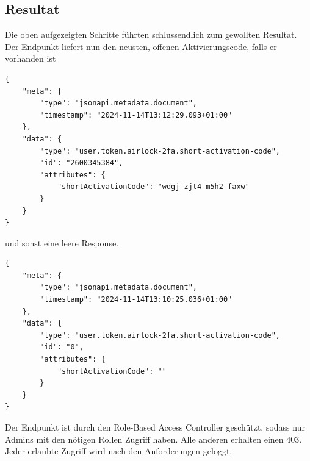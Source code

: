 \subsection{Resultat}
Die oben aufgezeigten Schritte führten schlussendlich zum gewollten Resultat. Der Endpunkt liefert nun den neusten, offenen Aktivierungscode, falls er vorhanden ist
\begin{verbatim}
{
	"meta": {
		"type": "jsonapi.metadata.document",
		"timestamp": "2024-11-14T13:12:29.093+01:00"
	},
	"data": {
		"type": "user.token.airlock-2fa.short-activation-code",
		"id": "2600345384",
		"attributes": {
			"shortActivationCode": "wdgj zjt4 m5h2 faxw"
		}
	}
}
\end{verbatim}
und sonst eine leere Response.
\begin{verbatim}
{
	"meta": {
		"type": "jsonapi.metadata.document",
		"timestamp": "2024-11-14T13:10:25.036+01:00"
	},
	"data": {
		"type": "user.token.airlock-2fa.short-activation-code",
		"id": "0",
		"attributes": {
			"shortActivationCode": ""
		}
	}
}
\end{verbatim}
Der Endpunkt ist durch den Role-Based Access Controller geschützt, sodass nur Admins mit den nötigen Rollen Zugriff haben. Alle anderen erhalten einen 403. Jeder erlaubte Zugriff wird nach den Anforderungen geloggt.
